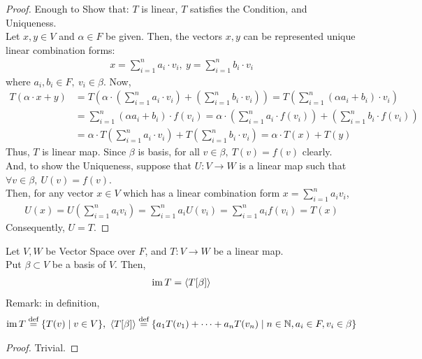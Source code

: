 \begin{proof}
    Enough to Show that: $T$ is linear, $T$ satisfies the Condition, and Uniqueness. \\
    Let $x,y \in V$ and $\alpha \in F$ be given. Then, the vectors $x,y$ can be represented unique linear combination forms:
    \begin{align*}
        x = \sum_{i=1}^{n} a_i \cdot v_i,\
        y = \sum_{i=1}^{n} b_i \cdot v_i
    \end{align*}
    where $a_i, b_i \in F,\ v_i \in \beta$. Now,
    \begin{align*}
        T(\alpha \cdot x + y)
        &= T\left( \alpha \cdot \left( \sum_{i=1}^{n} a_i \cdot v_i \right) + \left( \sum_{i=1}^{n} b_i \cdot v_i \right) \right)
        = T\left( \sum_{i=1}^{n} (\alpha a_i + b_i) \cdot v_i \right)  \\
        &= \sum_{i=1}^{n} (\alpha a_i + b_i) \cdot f(v_i)
        = \alpha \cdot \left(\sum_{i=1}^{n} a_i \cdot f(v_i) \right) + \left( \sum_{i=1}^{n} b_i \cdot f(v_i) \right)\\
        &= \alpha \cdot T\left(\sum_{i=1}^{n} a_i \cdot v_i\right) + T \left(\sum_{i=1}^{n} b_i \cdot v_i \right)
        = \alpha \cdot T(x) + T(y)
    \end{align*}
    Thus, $T$ is linear map. Since $\beta$ is basis, for all $v \in \beta,\ T(v) = f(v)$ clearly. \\
    And, to show the Uniqueness, suppose that $U:V \to W$ is a linear map such that $\forall v \in \beta,\ U(v) = f(v)$. \\
    Then, for any vector $x \in V$ which has a linear combination form $x = \sum_{i=1}^{n} a_i v_i$,
    \begin{align*}
        U(x) = U \left( \sum_{i=1}^{n} a_i v_i \right)
        = \sum_{i=1}^{n} a_i U(v_i)
        = \sum_{i=1}^{n} a_i f(v_i)
        = T(x)
    \end{align*}
    Consequently, $U = T$.
\end{proof}

\newpage
\begin{theorem}
    Let $V, W$ be Vector Space over $F$, and $T: V \to W$ be a linear map. 
    \\ Put $\beta \subset V$ be a basis of $V$. Then,
    \begin{align*}
        \operatorname{im} T = \langle T[\beta] \rangle
    \end{align*}
    Remark: in definition,
    \begin{align*}
        \operatorname{im} T \overset{\textnormal{def}}{=} \{T(v) \mid v \in V\},\
        \langle T[\beta] \rangle \overset{\textnormal{def}}{=} 
        \left\{a_1 T(v_1) + \cdots + a_n T(v_n) \;\middle|\; n \in \mathbb{N}, a_i \in F, v_i \in \beta \right\}
    \end{align*}
\end{theorem}
\begin{proof}
    Trivial.
\end{proof}

